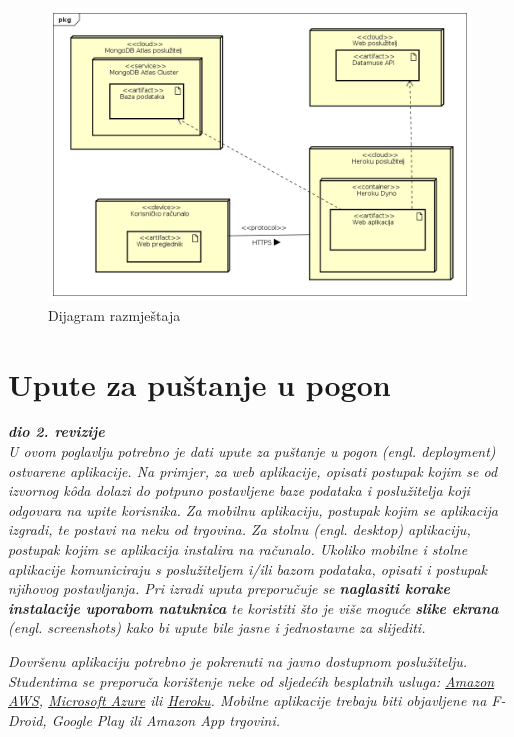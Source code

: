 			\begin{figure}[H]
				\includegraphics[width=\textwidth]{dijagrami/dijagram_razmjestaja.png} %
				\caption{Dijagram razmještaja}
				\label{fig:Dijagram_razmjestaja} %
			\end{figure}
			
			\eject 
		
		\section{Upute za puštanje u pogon}
		
			\textbf{\textit{dio 2. revizije}}\\
		
			 \textit{U ovom poglavlju potrebno je dati upute za puštanje u pogon (engl. deployment) ostvarene aplikacije. Na primjer, za web aplikacije, opisati postupak kojim se od izvornog kôda dolazi do potpuno postavljene baze podataka i poslužitelja koji odgovara na upite korisnika. Za mobilnu aplikaciju, postupak kojim se aplikacija izgradi, te postavi na neku od trgovina. Za stolnu (engl. desktop) aplikaciju, postupak kojim se aplikacija instalira na računalo. Ukoliko mobilne i stolne aplikacije komuniciraju s poslužiteljem i/ili bazom podataka, opisati i postupak njihovog postavljanja. Pri izradi uputa preporučuje se \textbf{naglasiti korake instalacije uporabom natuknica} te koristiti što je više moguće \textbf{slike ekrana} (engl. screenshots) kako bi upute bile jasne i jednostavne za slijediti.}
			
			
			 \textit{Dovršenu aplikaciju potrebno je pokrenuti na javno dostupnom poslužitelju. Studentima se preporuča korištenje neke od sljedećih besplatnih usluga: \href{https://aws.amazon.com/}{Amazon AWS}, \href{https://azure.microsoft.com/en-us/}{Microsoft Azure} ili \href{https://www.heroku.com/}{Heroku}. Mobilne aplikacije trebaju biti objavljene na F-Droid, Google Play ili Amazon App trgovini.}
			
			
			\eject 